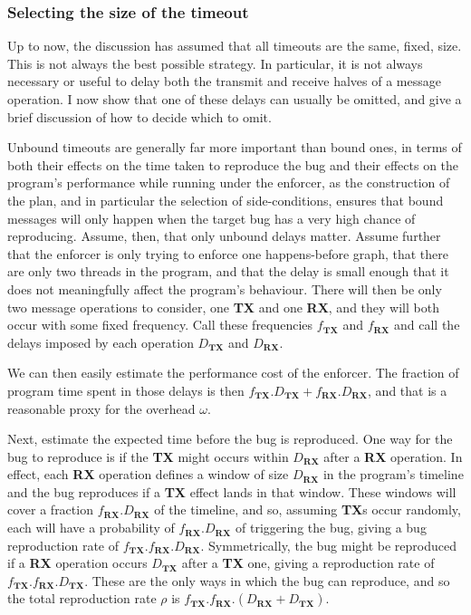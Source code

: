 \subsubsection{Selecting the size of the timeout}
\label{sect:using:timeout_balancing}


Up to now, the discussion has assumed that all timeouts are the same,
fixed, size.  This is not always the best possible strategy.  In
particular, it is not always necessary or useful to delay both the
transmit and receive halves of a message operation.  I now show that
one of these delays can usually be omitted, and give a brief
discussion of how to decide which to omit.

Unbound timeouts are generally far more important than bound ones, in
terms of both their effects on the time taken to reproduce the bug and
their effects on the program's performance while running under the
enforcer, as the construction of the plan, and in particular the
selection of side-conditions, ensures that bound messages will only
happen when the target bug has a very high chance of reproducing.
Assume, then, that only unbound delays matter.  Assume further that
the enforcer is only trying to enforce one happens-before graph, that
there are only two threads in the program, and that the delay is small
enough that it does not meaningfully affect the program's behaviour.
There will then be only two message operations to consider, one
\textbf{TX} and one \textbf{RX}, and they will both occur with some
fixed frequency.  Call these frequencies $f_{\mathbf{TX}}$ and
$f_{\mathbf{RX}}$ and call the delays imposed by each operation
$D_{\mathbf{TX}}$ and $D_{\mathbf{RX}}$.

We can then easily estimate the performance cost of the enforcer.  The
fraction of program time spent in those delays is then
$f_{\mathbf{TX}}.D_{\mathbf{TX}} + f_{\mathbf{RX}}.D_{\mathbf{RX}}$,
and that is a reasonable proxy for the overhead $\omega$.

Next, estimate the expected time before the bug is reproduced.  One
way for the bug to reproduce is if the \textbf{TX} might occurs within
$D_{\mathbf{RX}}$ after a \textbf{RX} operation.  In effect, each
\textbf{RX} operation defines a window of size $D_{\mathbf{RX}}$ in
the program's timeline and the bug reproduces if a \textbf{TX} effect
lands in that window.  These windows will cover a fraction
$f_{\mathbf{RX}}.D_{\mathbf{RX}}$ of the timeline, and so, assuming
\textbf{TX}s occur randomly, each will have a probability of
$f_{\mathbf{RX}}.D_{\mathbf{RX}}$ of triggering the bug, giving a bug
reproduction rate of
$f_{\mathbf{TX}}.f_{\mathbf{RX}}.D_{\mathbf{RX}}$.  Symmetrically, the
bug might be reproduced if a \textbf{RX} operation occurs
$D_{\mathbf{TX}}$ after a \textbf{TX} one, giving a reproduction rate
of $f_{\mathbf{TX}}.f_{\mathbf{RX}}.D_{\mathbf{TX}}$.  These are the
only ways in which the bug can reproduce, and so the total
reproduction rate $\rho$ is
$f_{\mathbf{TX}}.f_{\mathbf{RX}}.(D_{\mathbf{RX}} + D_{\mathbf{TX}})$.

